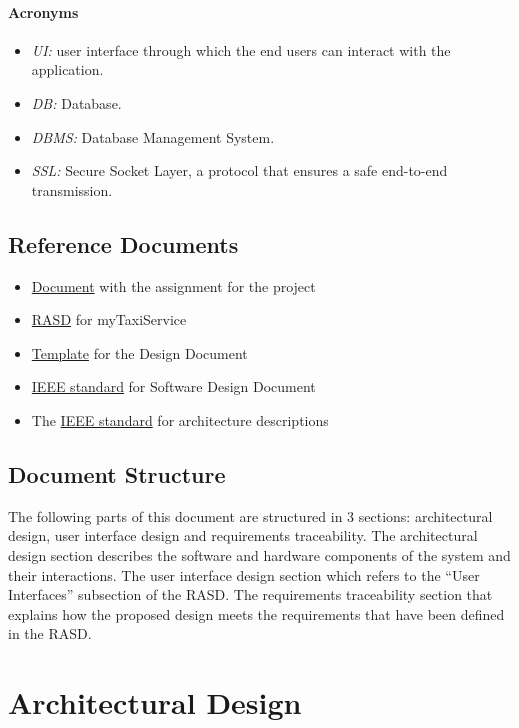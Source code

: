 \documentclass{article}
\begin{document}
\paragraph{Acronyms}
\begin{itemize}
	\item \textit{UI:} user interface through which the end users can interact with the application.
	\item \textit{DB:} Database.
	\item \textit{DBMS:} Database Management System.
	\item \textit{SSL:} Secure Socket Layer, a protocol that ensures a safe end-to-end transmission.
\end{itemize}
\subsection{Reference Documents}
\begin{itemize}
	\item \href{run:./external_references/assignments.pdf}{Document} with the assignment for the project
	\item \href{run:./external_references/Rasd.pdf}{RASD} for myTaxiService
	\item \href{run:./external_references/DDTOC.pdf}{Template} for the Design Document
	\item \href{run:./external_references/IEEESoftwareDesignDescriptions.pdf}{IEEE standard} for Software Design Document
	\item The \href{run:./external_references/IEEEArchitectureDescription.pdf}{IEEE standard} for architecture descriptions
\end{itemize}
\subsection{Document Structure}
The following parts of this document are structured in 3 sections: architectural design, user interface design and requirements traceability. The architectural design section describes the software and hardware components of the system and their interactions. The user interface design section which refers to the ``User Interfaces'' subsection of the RASD\@. The requirements traceability section that explains how the proposed design meets the requirements that have been defined in the RASD\@.
\clearpage
\section{Architectural Design}
\end{document}

